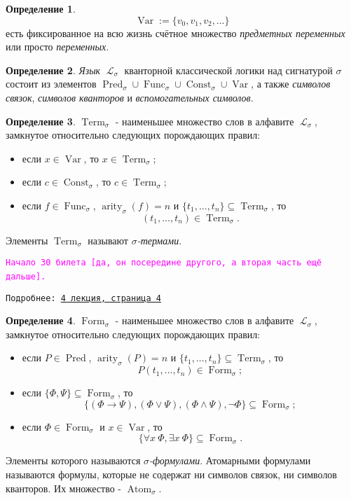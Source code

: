 \documentclass[a4paper,100pt]{article}
\theoremstyle{indented}
\theoremstyle{definition}
\newtheorem{defn}{Определение}
\theoremstyle{remark}
\DeclareMathOperator{\ra}{\rightarrow}
\DeclareMathOperator{\LL}{\mathscr{L}}
\DeclareMathOperator{\form}{Form}
\DeclareMathOperator{\Pred}{Pred}
\DeclareMathOperator{\Func}{Func}
\DeclareMathOperator{\Const}{Const}
\DeclareMathOperator{\arity}{arity}
\DeclareMathOperator{\Var}{Var}
\DeclareMathOperator{\Term}{Term}
\DeclareMathOperator{\Atom}{Atom}
\begin{document}
\begin{defn}
  \[
    \Var:=\{v_0, v_1, v_2, \ldots \}
  \]
  есть фиксированное на всю жизнь счётное множество \textit{предметных переменных} или просто \textit{переменных}.
\end{defn}

\begin{defn}
  \textit{Язык} $\LL_\sigma$ кванторной классической логики над сигнатурой $\sigma$ состоит из элементов $\Pred_\sigma \cup \Func_\sigma \cup \Const_\sigma \cup \Var$, а также \textit{символов связок}, \textit{символов кванторов} и \textit{вспомогательных символов}.
\end{defn}

\begin{defn}
  $\Term_\sigma$ - наименьшее множество слов в алфавите $\LL_\sigma$, замкнутое относительно следующих порождающих правил: 
  
  \begin{itemize}
    \item если $x\in \Var$, то $x\in \Term_\sigma$; 
    \item если $c\in \Const_\sigma$, то $c\in \Term_\sigma$; 
    \item если $f\in \Func_\sigma$, $\arity_\sigma (f)=n$ и $\{t_1, \ldots, t_n\}\subseteq \Term_\sigma$, то 
    \[
      (t_1, \ldots, t_n)\in \Term_\sigma.
    \]
  \end{itemize}

  Элементы $\Term_\sigma$ называют \textit{$\sigma$-термами}.
\end{defn}

\hrulefill

\texttt{\hypertarget{b30}{\textcolor{magenta}{Начало 30 билета [да, он посередине другого, а вторая часть ещё дальше].}}} \ 

\texttt{Подробнее: \href{http://www.mi-ras.ru/~speranski/courses/logic-1-2021-spring/slides_4.pdf}{4 лекция, страница 4}} 

\begin{defn}
  $\form_\sigma$ - наименьшее множество слов в алфавите $\LL_\sigma$, замкнутое относительно следующих порождающих правил:

  \begin{itemize}
    \item если $P\in \Pred$, $\arity_\sigma(P)=n$ и $\{t_1, \ldots, t_n\}\subseteq \Term_\sigma$, то 
    \[
      P(t_1, \ldots, t_n)\in \form_\sigma; 
    \]
    \item если $\{\Phi, \Psi\}\subseteq \form_\sigma$, то 
    \[
      \{(\Phi\ra \Psi), (\Phi\vee \Psi), (\Phi\wedge \Psi), \neg \Phi \} \subseteq \form_\sigma; 
    \]
    \item если $\Phi \in \form_\sigma$ и $x \in \Var$, то
    \[
      \{\forall x \: \Phi, \exists x \: \Phi\} \subseteq \form_\sigma.
    \]
  \end{itemize}

  Элементы которого называются \textit{$\sigma$-формулами}. Атомарными формулами называются формулы, которые не содержат ни символов связок, ни символов кванторов. Их множество - $\Atom_\sigma$. 
\end{defn}
\end{document}
